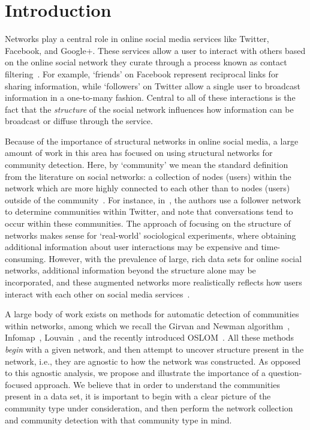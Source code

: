 \section{Introduction}

Networks play a central role in online social media services like Twitter, Facebook, and Google+. These services allow a user to interact with others based on the online social network they curate through a process known as contact filtering~\cite{cazabet2012automated}. For example, `friends' on Facebook represent reciprocal links for sharing information, while `followers' on Twitter allow a single user to broadcast information in a one-to-many fashion. Central to all of these interactions is the fact that the \emph{structure} of the social network influences how information can be broadcast or diffuse through the service.

Because of the importance of structural networks in online social media, a large amount of work in this area has focused on using structural networks for community detection. Here, by `community' we mean the standard definition from the literature on social networks: a collection of nodes (users) within the network which are more highly connected to each other than to nodes (users) outside of the community~\cite{girvan2002a, newman2004finding}. For instance, in~\cite{java2009we}, the authors use a follower network to determine communities within Twitter, and note that conversations tend to occur within these communities. The approach of focusing on the structure of networks makes sense for `real-world' sociological experiments, where obtaining additional information about user interactions may be expensive and time-consuming. However, with the prevalence of large, rich data sets for online social networks, additional information beyond the structure alone may be incorporated, and these augmented networks more realistically reflects how users interact with each other on social media services~\cite{grabowicz2012social}.

A large body of work exists on methods for automatic detection of communities within networks, among which we recall the Girvan and Newman algorithm~\cite{newman2004finding}, Infomap~\cite{Rosvall08mapsof}, Louvain~\cite{blondel2008fast}, and the recently introduced OSLOM~\cite{LancichinettiPlos}.
All these methods \emph{begin} with a given network, and then attempt to uncover structure present in the network, i.e., they are agnostic to how the network was constructed. As opposed to this agnostic analysis, we propose and illustrate the importance of a question-focused approach. We believe that in order to understand the communities present in a data set, it is important to begin with a clear picture of the community type under consideration, and then perform the network collection and community detection with that community type in mind.

